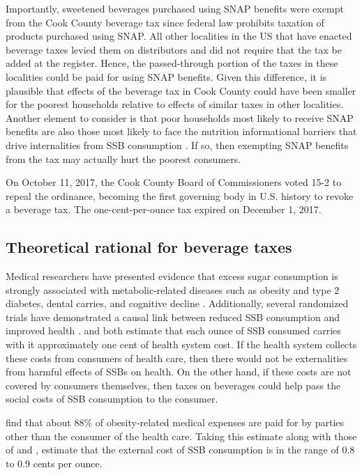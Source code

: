\documentclass[12pt]{article}
\begin{document}
Importantly, sweetened beverages purchased using SNAP benefits were exempt from the Cook County beverage tax since federal law prohibits taxation of products purchased using SNAP. All other localities in the US that have enacted beverage taxes levied them on distributors and did not require that the tax be added at the register. Hence, the passed-through portion of the taxes in these localities could be paid for using SNAP benefits. Given this difference, it is plausible that effects of the beverage tax in Cook County could have been smaller for the poorest households relative to effects of similar taxes in other localities. Another element to consider is that poor households most likely to receive SNAP benefits are also those most likely to face the nutrition informational barriers that drive internalities from SSB consumption \parencite{allcott2019should}. If so, then exempting SNAP benefits from the tax may actually hurt the poorest consumers.

On October 11, 2017, the Cook County Board of Commissioners voted 15-2 to repeal the ordinance, becoming the first governing body in U.S. history to revoke a beverage tax. The one-cent-per-ounce tax expired on December 1, 2017.

\subsection{Theoretical rational for beverage taxes}

Medical researchers have presented evidence that excess sugar consumption is strongly associated with metabolic-related diseases such as obesity and type 2 diabetes, dental carries, and cognitive decline \parencite{malik2010sugar, imamura2015consumption, malik2019sugar}. Additionally, several randomized trials have demonstrated a causal link between reduced SSB consumption and improved health \parencite{ebbeling2006effects, vartanian2007effects, ebbeling2012randomized, de2012trial}. \textcite{wang2012penny} and \textcite{long2015cost} both estimate that each ounce of SSB consumed carries with it approximately one cent of health system cost. If the health system collects these costs from consumers of health care, then there would not be externalities from harmful effects of SSBs on health. On the other hand, if these costs are not covered by consumers themselves, then taxes on beverages could help pass the social costs of SSB consumption to the consumer.

\textcite{cawley2012medical} find that about 88\% of obesity-related medical expenses are paid for by parties other than the consumer of the health care. Taking this estimate along with those of \textcite{wang2012penny} and \textcite{long2015cost}, \textcite{allcott2019regressive} estimate that the external cost of SSB consumption is in the range of 0.8 to 0.9 cents per ounce.
\end{document}
